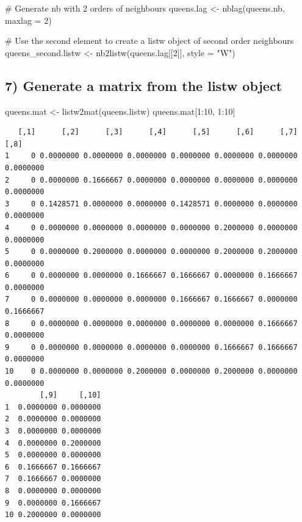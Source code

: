 \documentclass[
  letterpaper,
]{scrbook}
\newenvironment{Shaded}{\begin{snugshade}}{\end{snugshade}}
\newcommand{\AttributeTok}[1]{\textcolor[rgb]{0.40,0.45,0.13}{#1}}
\newcommand{\CommentTok}[1]{\textcolor[rgb]{0.37,0.37,0.37}{#1}}
\newcommand{\DecValTok}[1]{\textcolor[rgb]{0.68,0.00,0.00}{#1}}
\newcommand{\FunctionTok}[1]{\textcolor[rgb]{0.28,0.35,0.67}{#1}}
\newcommand{\NormalTok}[1]{\textcolor[rgb]{0.00,0.23,0.31}{#1}}
\newcommand{\OtherTok}[1]{\textcolor[rgb]{0.00,0.23,0.31}{#1}}
\newcommand{\SpecialCharTok}[1]{\textcolor[rgb]{0.37,0.37,0.37}{#1}}
\newcommand{\StringTok}[1]{\textcolor[rgb]{0.13,0.47,0.30}{#1}}
\begin{document}
\begin{Shaded}
\begin{Highlighting}[]
\CommentTok{\# Generate nb with 2 orders of neighbours}
\NormalTok{queens.lag }\OtherTok{\textless{}{-}} \FunctionTok{nblag}\NormalTok{(queens.nb, }\AttributeTok{maxlag =} \DecValTok{2}\NormalTok{)}

\CommentTok{\# Use the second element to create a listw object of second order neighbours}
\NormalTok{queens\_second.listw }\OtherTok{\textless{}{-}} \FunctionTok{nb2listw}\NormalTok{(queens.lag[[}\DecValTok{2}\NormalTok{]], }\AttributeTok{style =} \StringTok{"W"}\NormalTok{)}
\end{Highlighting}
\end{Shaded}

\hypertarget{generate-a-matrix-from-the-listw-object}{%
\subsection*{7) Generate a matrix from the listw
object}\label{generate-a-matrix-from-the-listw-object}}

\begin{Shaded}
\begin{Highlighting}[]
\NormalTok{queens.mat }\OtherTok{\textless{}{-}} \FunctionTok{listw2mat}\NormalTok{(queens.listw)}
\NormalTok{queens.mat[}\DecValTok{1}\SpecialCharTok{:}\DecValTok{10}\NormalTok{, }\DecValTok{1}\SpecialCharTok{:}\DecValTok{10}\NormalTok{]}
\end{Highlighting}
\end{Shaded}

\begin{verbatim}
   [,1]      [,2]      [,3]      [,4]      [,5]      [,6]      [,7]      [,8]
1     0 0.0000000 0.0000000 0.0000000 0.0000000 0.0000000 0.0000000 0.0000000
2     0 0.0000000 0.1666667 0.0000000 0.0000000 0.0000000 0.0000000 0.0000000
3     0 0.1428571 0.0000000 0.0000000 0.1428571 0.0000000 0.0000000 0.0000000
4     0 0.0000000 0.0000000 0.0000000 0.0000000 0.2000000 0.0000000 0.0000000
5     0 0.0000000 0.2000000 0.0000000 0.0000000 0.2000000 0.2000000 0.0000000
6     0 0.0000000 0.0000000 0.1666667 0.1666667 0.0000000 0.1666667 0.0000000
7     0 0.0000000 0.0000000 0.0000000 0.1666667 0.1666667 0.0000000 0.1666667
8     0 0.0000000 0.0000000 0.0000000 0.0000000 0.0000000 0.1666667 0.0000000
9     0 0.0000000 0.0000000 0.0000000 0.0000000 0.1666667 0.1666667 0.0000000
10    0 0.0000000 0.0000000 0.2000000 0.0000000 0.2000000 0.0000000 0.0000000
        [,9]     [,10]
1  0.0000000 0.0000000
2  0.0000000 0.0000000
3  0.0000000 0.0000000
4  0.0000000 0.2000000
5  0.0000000 0.0000000
6  0.1666667 0.1666667
7  0.1666667 0.0000000
8  0.0000000 0.0000000
9  0.0000000 0.1666667
10 0.2000000 0.0000000
\end{verbatim}
\end{document}

